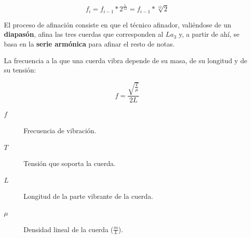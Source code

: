 \documentclass[10pt,a4paper]{article}
\begin{document}
	\begin{equation}
		f_i = f_{i-1} * 2^{\frac{1}{12}} = f_{i-1} * \sqrt[12]{2}
	\end{equation}
	
	El proceso de afinación consiste en que el técnico afinador, valiéndose de 
	un \textbf{diapasón}, afina las tres cuerdas que corresponden al $La_3$ y, 
	a partir de ahí, se basa en la \textbf{serie armónica} para afinar el resto 
	de notas.
	
	La frecuencia a la que una cuerda vibra depende de su masa, de su longitud 
	y de su tensión: \cite{cuerda}
	
	\begin{equation}
		f = \frac{\sqrt{\frac{T}{\mu}}}{2L}
	\end{equation}
	
	\begin{description}
		\item[$f$] Frecuencia de vibración.
		\item[$T$] Tensión que soporta la cuerda.
		\item[$L$] Longitud de la parte vibrante de la cuerda.
		\item[$\mu$] Densidad lineal de la cuerda ($\frac{m}{L}$).
	\end{description}
	
	
	\clearpage
	
	\nocite{piano}
	
\end{document}
